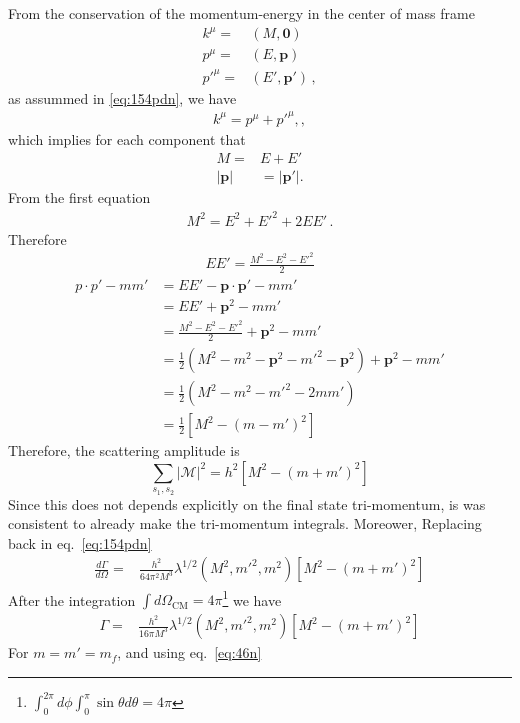 \begin{frame}
From the conservation of the momentum-energy in the center of mass frame
\begin{align}
  k^{\mu}=&\left(M,\boldsymbol{0}\right) \nonumber\\
  p^{\mu}=&\left(E,\boldsymbol{p}\right) \nonumber\\
  {p'}^{\mu}=&\left(E',\boldsymbol{p}'\right) \,,
\end{align}
as assummed in \eqref{eq:154pdn}, we have
\begin{align}
  k^{\mu}=p^{\mu}+{p'}^{\mu},,
\end{align}
which implies for each component that
\begin{align}
  M=&E+{E'}\nonumber\\
|\mathbf{p}|&=|\mathbf{p}'|.
\end{align}
From the first equation
\begin{align}
  M^2=E^2+{E'}^2+2EE'\,.
\end{align}
Therefore
\begin{align}
  E{E'}=\frac{M^2-E^2-{E'}^2}{2}
\end{align}
\begin{align*}
  p\cdot p'-m {m'}&=EE'-\mathbf{p}\cdot\mathbf{p}'-m {m'}\\
&=EE'+\mathbf{p}^2-m {m'}\\
&=\frac{M^2-E^2-{E'}^2}{2}+\mathbf{p}^2-m {m'}\nonumber\\
&=\frac12\left(M^2-m^2-\mathbf{p}^2-{m'}^2-\mathbf{p}^2\right)+\mathbf{p}^2-m {m'}\\
&=\frac12\left(M^2-m^2-{m'}^2-2m{m'}\right)\\
&=\frac12\left[M^2-(m-{m'})^2\right]
\end{align*}
Therefore, the scattering  amplitude is
\begin{equation}
\sum_{s_1,s_2}|\mathcal{M}|^{2}=h^2\left[M^2-(m+{m'})^2\right]
\end{equation}
Since this does not depends explicitly on the final state tri-momentum, is was consistent to already make the tri-momentum integrals. Moreower, Replacing back in eq.~\eqref{eq:154pdn}
\begin{align}
\frac{d\Gamma}{d\Omega}=
&\frac{h^2}{64 \pi^2M^3}\lambda^{1/2}(M^2,{m'}^2,m^2)\left[M^2-(m+{m'})^2\right]
\end{align}
After the integration $\int d\Omega_{\text{CM}}=4\pi$\footnote{$\int_0^{2\pi}d\phi\int_0^\pi\sin\theta d\theta=4\pi $} we have
\begin{align}
\Gamma=&\frac{h^2}{16 \pi M^3}\lambda^{1/2}(M^2,{m'}^2,m^2)\left[M^2-(m+{m'})^2\right]
\end{align}
For $m={m'}=m_f$, and using eq.~\eqref{eq:46n}



\end{frame}
